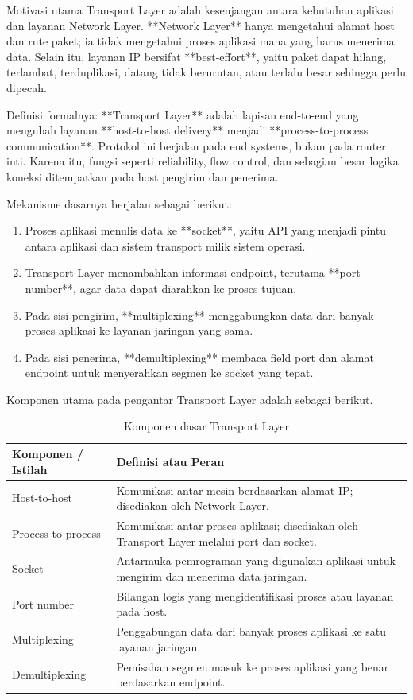 Motivasi utama Transport Layer adalah kesenjangan antara kebutuhan aplikasi dan layanan Network Layer. **Network Layer** hanya mengetahui alamat host dan rute paket; ia tidak mengetahui proses aplikasi mana yang harus menerima data. Selain itu, layanan IP bersifat **best-effort**, yaitu paket dapat hilang, terlambat, terduplikasi, datang tidak berurutan, atau terlalu besar sehingga perlu dipecah.

Definisi formalnya: **Transport Layer** adalah lapisan end-to-end yang mengubah layanan **host-to-host delivery** menjadi **process-to-process communication**. Protokol ini berjalan pada end systems, bukan pada router inti. Karena itu, fungsi seperti reliability, flow control, dan sebagian besar logika koneksi ditempatkan pada host pengirim dan penerima.

Mekanisme dasarnya berjalan sebagai berikut:
\begin{enumerate}
    \item Proses aplikasi menulis data ke **socket**, yaitu API yang menjadi pintu antara aplikasi dan sistem transport milik sistem operasi.
    \item Transport Layer menambahkan informasi endpoint, terutama **port number**, agar data dapat diarahkan ke proses tujuan.
    \item Pada sisi pengirim, **multiplexing** menggabungkan data dari banyak proses aplikasi ke layanan jaringan yang sama.
    \item Pada sisi penerima, **demultiplexing** membaca field port dan alamat endpoint untuk menyerahkan segmen ke socket yang tepat.
\end{enumerate}

Komponen utama pada pengantar Transport Layer adalah sebagai berikut.

\begin{table}[H]
\centering
\begin{tabularx}{\textwidth}{|L{0.28\textwidth}|X|}
\hline
\textbf{Komponen / Istilah} & \textbf{Definisi atau Peran} \\
\hline
Host-to-host & Komunikasi antar-mesin berdasarkan alamat IP; disediakan oleh Network Layer. \\
\hline
Process-to-process & Komunikasi antar-proses aplikasi; disediakan oleh Transport Layer melalui port dan socket. \\
\hline
Socket & Antarmuka pemrograman yang digunakan aplikasi untuk mengirim dan menerima data jaringan. \\
\hline
Port number & Bilangan logis yang mengidentifikasi proses atau layanan pada host. \\
\hline
Multiplexing & Penggabungan data dari banyak proses aplikasi ke satu layanan jaringan. \\
\hline
Demultiplexing & Pemisahan segmen masuk ke proses aplikasi yang benar berdasarkan endpoint. \\
\hline
\end{tabularx}
\caption{Komponen dasar Transport Layer}
\label{tab:komponen-transport-layer}
\end{table}


